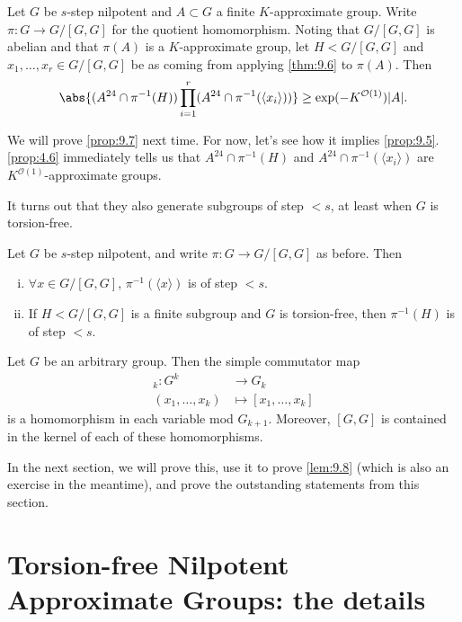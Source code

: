 \documentclass{article}
\newcommand{\bigO}{\mathcal{O}}
\numberwithin{equation}{section}
\begin{document}
\begin{nprop}\label{prop:9.7}
  Let $G$ be $s$-step nilpotent and $A \subset G$ a finite $K$-approximate group.
  Write $\pi: G \to G/[G,G]$ for the quotient homomorphism.
  Noting that $G/[G,G]$ is abelian and that $\pi(A)$ is a $K$-approximate group, let $H < G/[G,G]$ and $x_1, \dotsc, x_r \in G/[G,G]$ be as coming from applying \cref{thm:9.6} to $\pi(A)$.
  Then
  \begin{align*}
    \abs{(A^{24} \cap \pi^{-1}(H)) \prod_{i=1}^r(A^{24} \cap \pi^{-1}(\langle x_i \rangle))} \geq \exp(-K^{\bigO(1)})|A|.
  \end{align*}
\end{nprop}
We will prove \cref{prop:9.7} next time. For now, let's see how it implies \cref{prop:9.5}. \cref{prop:4.6} immediately tells us that $A^{24} \cap \pi^{-1}(H)$ and $A^{24} \cap \pi^{-1}(\langle x_i \rangle)$ are $K^{\bigO(1)}$-approximate groups.

It turns out that they also generate subgroups of step $<s$, at least when $G$ is torsion-free.

\begin{nlemma}\label{lem:9.8}
  Let $G$ be $s$-step nilpotent, and write $\pi: G \to G/[G,G]$ as before.
  Then
  \begin{enumerate}[(i)]
    \item $\forall x \in G/[G,G]$, $\pi^{-1}(\langle x \rangle)$ is of step $<s$.
    \item If $H < G/[G,G]$ is a finite subgroup and $G$ is torsion-free, then $\pi^{-1}(H)$ is of step $<s$.
  \end{enumerate}
\end{nlemma}
\begin{nlemma}\label{lem:9.9}
  Let $G$ be an arbitrary group. Then the simple commutator map
  \begin{align*}
    [\cdot, \dotsc, \cdot]_k : G^k &\longrightarrow G_k \\
    (x_1, \dotsc, x_k) &\longmapsto [x_1, \dotsc, x_k]
  \end{align*}
  is a homomorphism in each variable mod $G_{k+1}$.
  Moreover, $[G,G]$ is contained in the kernel of each of these homomorphisms.
\end{nlemma}

In the next section, we will prove this, use it to prove \cref{lem:9.8} (which is also an exercise in the meantime), and prove the outstanding statements from this section.
\clearpage
\section{Torsion-free Nilpotent Approximate Groups: the details}
\end{document}
